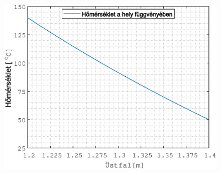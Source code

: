 \documentclass[12pt, a4paper, onecolumn]{article}
\begin{document}
\begin{figure}
	\includegraphics[width=1\linewidth]{homersekletfuggvenyHS9.eps}
	\caption{}
	\label{fig:waveforms}
\end{figure}
\end{document}
